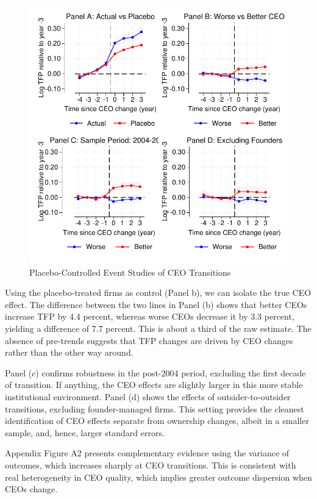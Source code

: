 \documentclass[11pt,a4paper]{article}
\begin{document}
\begin{figure}[htbp]
\centering
\includegraphics[width=\textwidth]{figure/event_study.pdf}
\caption{Placebo-Controlled Event Studies of CEO Transitions}
\label{fig:event_study_main}
\end{figure}

Using the placebo-treated firms as control (Panel b), we can isolate the true CEO effect. The difference between the two lines in Panel (b) shows that better CEOs increase TFP by 4.4 percent, whereas worse CEOs decrease it by 3.3 percent, yielding a difference of 7.7 percent. This is about a third of the raw estimate. The absence of pre-trends suggests that TFP changes are driven by CEO changes rather than the other way around.

Panel (c) confirms robustness in the post-2004 period, excluding the first decade of transition. If anything, the CEO effects are slightly larger in this more stable institutional environment. Panel (d) shows the effects of outsider-to-outsider transitions, excluding founder-managed firms. This setting provides the cleanest identification of CEO effects separate from ownership changes, albeit in a smaller sample, and, hence, larger standard errors.

Appendix Figure A2 presents complementary evidence using the variance of outcomes, which increases sharply at CEO transitions. This is consistent with real heterogeneity in CEO quality, which implies greater outcome dispersion when CEOs change.
\end{document}
